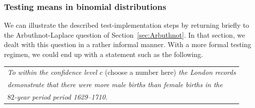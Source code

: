 \subsubsection{Testing means in binomial distributions}

We can illustrate the described test-implementation steps by returning briefly to the Arbuthnot-Laplace question of Section~\ref{sec:Arbuthnot}.   In that section, we dealt with this question in a rather informal manner.  With a more formal testing regimen, we could end up with a statement such as the following.

\smallskip

\begin{tabular}{l}
{\em To within the confidence level $c$} (choose a number here) {\em the London records} \\
{\em demonstrate that there were more male births than female births in the} \\
{\em $82$-year period period 1629--1710.}
\end{tabular}

\smallskip

